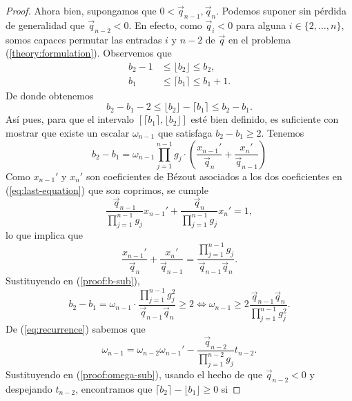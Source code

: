 \begin{proof}
	Ahora bien, supongamos que $0 < \vec{q}_{n - 1}, \vec{q}_n$. Podemos suponer sin pérdida de
	generalidad que $\vec{q}_{n - 2} < 0$. En efecto, como $\vec{q}_i < 0$ para alguna $i \in
	\lbrace 2, \ldots, n \rbrace$, somos capaces permutar las entradas $i$ y $n - 2$ de $\vec{q}$ en
	el problema (\ref{theory:formulation}). Observemos que
	\begin{align*}
		b_2 - 1 &\leq \lfloor b_2 \rfloor \leq b_2, \\
		b_1 &\leq \lceil b_1 \rceil \leq b_1 + 1.
	\end{align*}
	De donde obtenemos
	\begin{equation*}
		b_2 - b_1 - 2 \leq \lfloor b_2 \rfloor - \lceil b_1 \rceil \leq b_2 - b_1.
	\end{equation*}
	Así pues, para que el intervalo $[\lceil b_1 \rceil, \lfloor b_2 \rfloor]$ esté bien definido,
	es suficiente con mostrar que existe un escalar $\omega_{n - 1}$ que satisfaga $b_2 - b_1 \geq
	2$. Tenemos
	\begin{equation}
		\label{proof:b-sub}
		b_2 - b_1 = \omega_{n - 1}\prod_{j = 1}^{n-1}g_j \cdot
			\left(\frac{x_{n-1}'}{\vec{q}_n} + \frac{x_n'}{\vec{q}_{n - 1}}\right)
	\end{equation}
	Como $x_{n - 1}'$ y $x_n'$ son coeficientes de Bézout asociados a los dos coeficientes en
	(\ref{eq:last-equation}) que son coprimos, se cumple
	\begin{equation*}
		\frac{\vec{q}_{n - 1}}{\prod_{j = 1}^{n-1}g_j}x_{n-1}' +
		\frac{\vec{q}_{n}}{\prod_{j = 1}^{n-1}g_j}x_{n}' = 1,
	\end{equation*}
	lo que implica que
	\begin{equation*}
		\frac{x_{n-1}'}{\vec{q}_n} + \frac{x_n'}{\vec{q}_{n - 1}} = \frac{\prod_{j =
		1}^{n-1}g_j}{\vec{q}_{n-1}\vec{q}_n}.
	\end{equation*}
	Sustituyendo en (\ref{proof:b-sub}),
	\begin{equation}
		\label{proof:omega-sub}
		b_2 - b_1 = \omega_{n-1}\cdot \frac{\prod_{j=1}^{n-1}g_j^2}{\vec{q}_{n-1}\vec{q}_n} \geq 2
		\iff \omega_{n-1} \geq 2\frac{\vec{q}_{n-1}\vec{q}_n}{\prod_{j=1}^{n-1}g_j^2}.
	\end{equation}
	De (\ref{eq:recurrence}) sabemos que
	\begin{equation*}
		\omega_{n-1} = \omega_{n-2}\omega_{n-1}' -
		\frac{\vec{q}_{n-2}}{\prod_{j=1}^{n-2}g_j}t_{n-2}.
	\end{equation*}
	Sustituyendo en (\ref{proof:omega-sub}), usando el hecho de que $\vec{q}_{n-2} < 0$ y despejando
	$t_{n-2}$, encontramos que $\lceil b_2 \rceil - \lfloor b_1 \rfloor \geq 0$ si

\end{proof}
